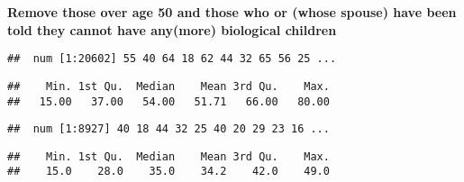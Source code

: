 \documentclass[
]{article}
\newenvironment{Shaded}{\begin{snugshade}}{\end{snugshade}}
\newcommand{\CommentTok}[1]{\textcolor[rgb]{0.56,0.35,0.01}{\textit{#1}}}
\newcommand{\DecValTok}[1]{\textcolor[rgb]{0.00,0.00,0.81}{#1}}
\newcommand{\FunctionTok}[1]{\textcolor[rgb]{0.13,0.29,0.53}{\textbf{#1}}}
\newcommand{\NormalTok}[1]{#1}
\newcommand{\OtherTok}[1]{\textcolor[rgb]{0.56,0.35,0.01}{#1}}
\newcommand{\SpecialCharTok}[1]{\textcolor[rgb]{0.81,0.36,0.00}{\textbf{#1}}}
\begin{document}
\textbf{Remove those over age 50 and those who or (whose spouse) have
been told they cannot have any(more) biological children}

\begin{Shaded}
\end{Shaded}

\begin{verbatim}
##  num [1:20602] 55 40 64 18 62 44 32 65 56 25 ...
\end{verbatim}

\begin{Shaded}
\end{Shaded}

\begin{verbatim}
##    Min. 1st Qu.  Median    Mean 3rd Qu.    Max. 
##   15.00   37.00   54.00   51.71   66.00   80.00
\end{verbatim}

\begin{Shaded}
\end{Shaded}

\begin{verbatim}
##  num [1:8927] 40 18 44 32 25 40 20 29 23 16 ...
\end{verbatim}

\begin{Shaded}
\end{Shaded}

\begin{verbatim}
##    Min. 1st Qu.  Median    Mean 3rd Qu.    Max. 
##    15.0    28.0    35.0    34.2    42.0    49.0
\end{verbatim}
\end{document}
